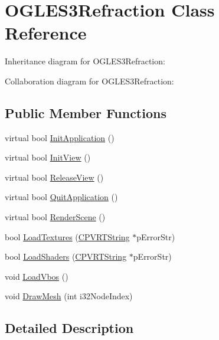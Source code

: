 \hypertarget{class_o_g_l_e_s3_refraction}{\section{O\+G\+L\+E\+S3\+Refraction Class Reference}
\label{class_o_g_l_e_s3_refraction}
}


Inheritance diagram for O\+G\+L\+E\+S3\+Refraction\+:


Collaboration diagram for O\+G\+L\+E\+S3\+Refraction\+:
\subsection*{Public Member Functions}
\begin{DoxyCompactItemize}
\item 
virtual bool \hyperlink{class_o_g_l_e_s3_refraction_a268370ebee386499acf56ee01074f434}{Init\+Application} ()
\item 
virtual bool \hyperlink{class_o_g_l_e_s3_refraction_acb7b2c33b644ac389f558c7369d031d3}{Init\+View} ()
\item 
virtual bool \hyperlink{class_o_g_l_e_s3_refraction_ae491d34d2750d3f6d2627c6c0bc43c28}{Release\+View} ()
\item 
virtual bool \hyperlink{class_o_g_l_e_s3_refraction_a52552b5c25ccbac725c09a4de40db811}{Quit\+Application} ()
\item 
virtual bool \hyperlink{class_o_g_l_e_s3_refraction_ae414bfce8b9f0d14fb42543ef29378f0}{Render\+Scene} ()
\item 
bool \hyperlink{class_o_g_l_e_s3_refraction_af9ad9796f61e1e748c4102429dbda898}{Load\+Textures} (\hyperlink{class_c_p_v_r_t_string}{C\+P\+V\+R\+T\+String} $\ast$p\+Error\+Str)
\item 
bool \hyperlink{class_o_g_l_e_s3_refraction_acea0c8140b9de04de453734cbc4f3415}{Load\+Shaders} (\hyperlink{class_c_p_v_r_t_string}{C\+P\+V\+R\+T\+String} $\ast$p\+Error\+Str)
\item 
void \hyperlink{class_o_g_l_e_s3_refraction_a92af008bad10b9fd3b32693cca8fc4f9}{Load\+Vbos} ()
\item 
void \hyperlink{class_o_g_l_e_s3_refraction_a063f002f81f6e7c84d1cf4687ee65db9}{Draw\+Mesh} (int i32\+Node\+Index)
\end{DoxyCompactItemize}


\subsection{Detailed Description}


